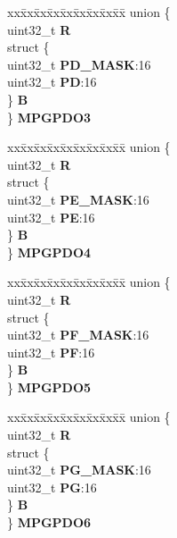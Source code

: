 \begin{DoxyCompactItemize}
\begin{tabbing}
\end{tabbing}\item 
\mbox{\label{structSIU__tag_a781f5c9795a0af2196e44aecf541ca5d}} 
\begin{tabbing}
xx\=xx\=xx\=xx\=xx\=xx\=xx\=xx\=xx\=\kill
union \{\\
\>uint32\_t {\bfseries R}\\
\>struct \{\\
\>\>uint32\_t {\bfseries PD\_MASK}:16\\
\>\>uint32\_t {\bfseries PD}:16\\
\>\} {\bfseries B}\\
\} {\bfseries MPGPDO3}\\

\end{tabbing}\item 
\mbox{\label{structSIU__tag_a2122b2fda8ad40ba795bc714b77f6b61}} 
\begin{tabbing}
xx\=xx\=xx\=xx\=xx\=xx\=xx\=xx\=xx\=\kill
union \{\\
\>uint32\_t {\bfseries R}\\
\>struct \{\\
\>\>uint32\_t {\bfseries PE\_MASK}:16\\
\>\>uint32\_t {\bfseries PE}:16\\
\>\} {\bfseries B}\\
\} {\bfseries MPGPDO4}\\

\end{tabbing}\item 
\mbox{\label{structSIU__tag_a41da9fc03e15cc894d5820541bbdc798}} 
\begin{tabbing}
xx\=xx\=xx\=xx\=xx\=xx\=xx\=xx\=xx\=\kill
union \{\\
\>uint32\_t {\bfseries R}\\
\>struct \{\\
\>\>uint32\_t {\bfseries PF\_MASK}:16\\
\>\>uint32\_t {\bfseries PF}:16\\
\>\} {\bfseries B}\\
\} {\bfseries MPGPDO5}\\

\end{tabbing}\item 
\mbox{\label{structSIU__tag_acdb779a86cd90a533ee1bffcb04071d7}} 
\begin{tabbing}
xx\=xx\=xx\=xx\=xx\=xx\=xx\=xx\=xx\=\kill
union \{\\
\>uint32\_t {\bfseries R}\\
\>struct \{\\
\>\>uint32\_t {\bfseries PG\_MASK}:16\\
\>\>uint32\_t {\bfseries PG}:16\\
\>\} {\bfseries B}\\
\} {\bfseries MPGPDO6}\\


\end{tabbing}
\end{DoxyCompactItemize}
